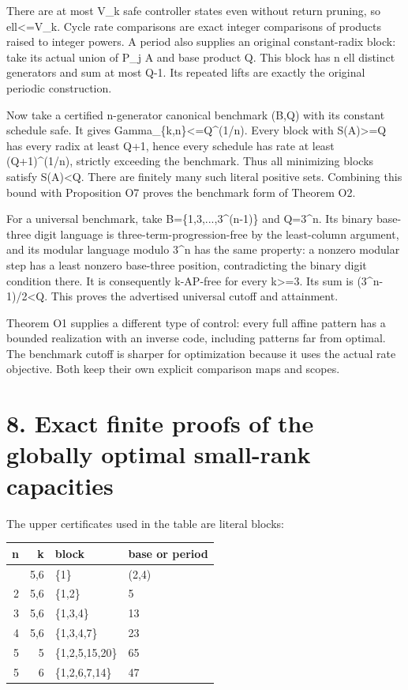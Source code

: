 There are at most V\_k safe controller states even without return pruning, so ell\textless=V\_k. Cycle rate comparisons are exact integer comparisons of products raised to integer powers. A period also supplies an original constant-radix block: take its actual union of P\_j A and base product Q. This block has n ell distinct generators and sum at most Q-1. Its repeated lifts are exactly the original periodic construction.

Now take a certified n-generator canonical benchmark (B,Q) with its constant schedule safe. It gives Gamma\_\{k,n\}\textless=Q\^{}(1/n). Every block with S(A)\textgreater=Q has every radix at least Q+1, hence every schedule has rate at least (Q+1)\^{}(1/n), strictly exceeding the benchmark. Thus all minimizing blocks satisfy S(A)\textless Q. There are finitely many such literal positive sets. Combining this bound with Proposition O7 proves the benchmark form of Theorem O2.

For a universal benchmark, take B=\{1,3,...,3\^{}(n-1)\} and Q=3\^{}n. Its binary base-three digit language is three-term-progression-free by the least-column argument, and its modular language modulo 3\^{}n has the same property: a nonzero modular step has a least nonzero base-three position, contradicting the binary digit condition there. It is consequently k-AP-free for every k\textgreater=3. Its sum is (3\^{}n-1)/2\textless Q. This proves the advertised universal cutoff and attainment.

Theorem O1 supplies a different type of control: every full affine pattern has a bounded realization with an inverse code, including patterns far from optimal. The benchmark cutoff is sharper for optimization because it uses the actual rate objective. Both keep their own explicit comparison maps and scopes.

\section{8. Exact finite proofs of the globally optimal small-rank capacities}\label{n04-exact-finite-proofs-of-the-globally-optimal-small-rank-capacities}

The upper certificates used in the table are literal blocks:

\begin{longtable}[]{@{}rrll@{}}
\toprule\noalign{}
n & k & block & base or period \\
\midrule\noalign{}
\endhead
\bottomrule\noalign{}
\endlastfoot
1 & 5,6 & \{1\} & (2,4) \\
2 & 5,6 & \{1,2\} & 5 \\
3 & 5,6 & \{1,3,4\} & 13 \\
4 & 5,6 & \{1,3,4,7\} & 23 \\
5 & 5 & \{1,2,5,15,20\} & 65 \\
5 & 6 & \{1,2,6,7,14\} & 47 \\
\end{longtable}

